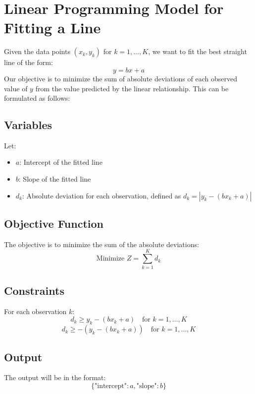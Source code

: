 \documentclass{article}
\begin{document}
\section*{Linear Programming Model for Fitting a Line}

Given the data points \( (x_k, y_k) \) for \( k = 1, \ldots, K \), we want to fit the best straight line of the form:
\[
y = bx + a
\]
Our objective is to minimize the sum of absolute deviations of each observed value of \( y \) from the value predicted by the linear relationship. This can be formulated as follows:

\subsection*{Variables}
Let:
\begin{itemize}
    \item \( a \): Intercept of the fitted line
    \item \( b \): Slope of the fitted line
    \item \( d_k \): Absolute deviation for each observation, defined as \( d_k = |y_k - (bx_k + a)| \)
\end{itemize}

\subsection*{Objective Function}
The objective is to minimize the sum of the absolute deviations:
\[
\text{Minimize } Z = \sum_{k=1}^{K} d_k
\]

\subsection*{Constraints}
For each observation \( k \):
\[
d_k \geq y_k - (bx_k + a) \quad \text{for } k = 1, \ldots, K
\]
\[
d_k \geq -(y_k - (bx_k + a)) \quad \text{for } k = 1, \ldots, K
\]

\subsection*{Output}
The output will be in the format:
\[
\{ \text{"intercept"}: a, \text{"slope"}: b \}
\]
\end{document}
